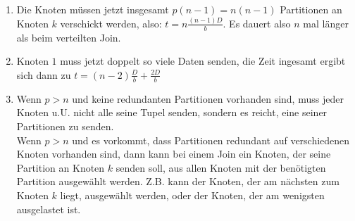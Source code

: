 \documentclass[a4paper]{article}
\begin{document}
\begin{enumerate}[label=\alph*)]
\item Die Knoten müssen jetzt insgesamt $p(n-1)=n(n-1)$ Partitionen an Knoten $k$ verschickt werden, also: $t=n\frac{(n-1)D}{b}$. Es dauert also $n$ mal länger als beim verteilten Join.\\
\item Knoten $1$ muss jetzt doppelt so viele Daten senden, die Zeit ingesamt ergibt sich dann zu $t=(n-2)\frac{D}{b} + \frac{2D}{b}$
\item Wenn $p>n$ und keine redundanten Partitionen vorhanden sind, muss jeder Knoten u.U. nicht alle seine Tupel senden, sondern es reicht, eine seiner Partitionen zu senden.\\
Wenn $p>n$ und es vorkommt, dass Partitionen redundant auf verschiedenen Knoten vorhanden sind, dann kann bei einem Join ein Knoten, der seine Partition an Knoten $k$ senden soll, aus allen Knoten mit der benötigten Partition ausgewählt werden. Z.B. kann der Knoten, der am nächsten zum Knoten $k$ liegt, ausgewählt werden, oder der Knoten, der am wenigsten ausgelastet ist. 
\end{enumerate}

\newpage
\end{document}

